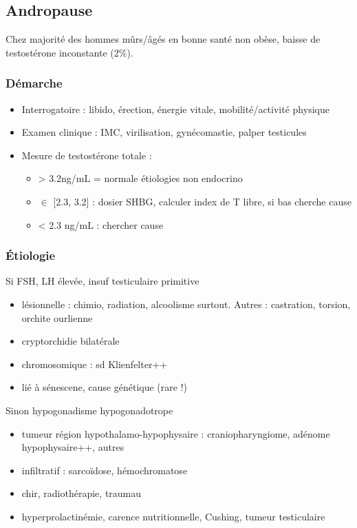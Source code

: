 \documentclass[11pt]{article}
\begin{document}
\subsection{Andropause}
\label{sec:org05b45cc}
Chez majorité des hommes mûrs/âgés en bonne santé non obèse, baisse de
testostérone inconstante (2\%).

\subsubsection{Démarche}
\label{sec:org6992c75}
\begin{itemize}
\item Interrogatoire : libido, érection, énergie vitale, mobilité/activité physique
\item Examen clinique : IMC, virilisation, gynécomastie, palper testicules
\item Mesure de testostérone totale :
\begin{itemize}
\item > 3.2ng/mL = normale \thus étiologies non endocrino
\item \(\in\) [2.3, 3.2] : dosier SHBG, calculer index de T libre, si bas cherche cause
\item < 2.3 ng/mL : chercher cause
\end{itemize}
\end{itemize}
\subsubsection{Étiologie}
\label{sec:org24a717f}
Si FSH, LH élevée, insuf testiculaire primitive 
\begin{itemize}
\item lésionnelle : chimio, radiation, alcoolisme surtout. Autres : castration,
torsion, orchite ourlienne
\item cryptorchidie bilatérale
\item chromosomique : sd Klienfelter++
\item lié à sénescene, cause génétique (rare !)
\end{itemize}
Sinon hypogonadisme hypogonadotrope 
\begin{itemize}
\item tumeur région hypothalamo-hypophysaire : craniopharyngiome, adénome
hypophysaire++, autres
\item infiltratif : sarcoïdose, hémochromatose
\item chir, radiothérapie, traumau
\item hyperprolactinémie, carence nutritionnelle, Cushing, tumeur testiculaire
\end{itemize}
\end{document}
